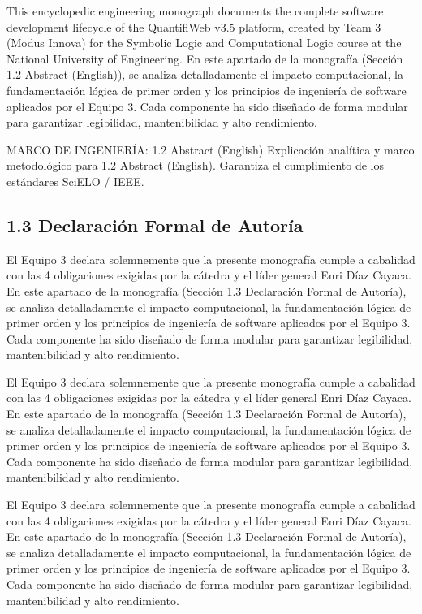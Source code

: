 \documentclass[11pt,a4paper]{article}
\begin{document}
This encyclopedic engineering monograph documents the complete software
development lifecycle of the QuantifiWeb v3.5 platform, created by Team
3 (Modus Innova) for the Symbolic Logic and Computational Logic course
at the National University of Engineering. En este apartado de la
monografía (Sección 1.2 Abstract (English)), se analiza detalladamente
el impacto computacional, la fundamentación lógica de primer orden y los
principios de ingeniería de software aplicados por el Equipo 3. Cada
componente ha sido diseñado de forma modular para garantizar
legibilidad, mantenibilidad y alto rendimiento.

\medskip\hrulefill\medskip
 MARCO DE INGENIERÍA: 1.2 Abstract (English)
Explicación analítica y marco metodológico para 1.2 Abstract (English).
Garantiza el cumplimiento de los estándares SciELO / IEEE.
\medskip\hrulefill\medskip

\medskip\hrulefill\medskip

\subsection{1.3 Declaración Formal de Autoría}

El Equipo 3 declara solemnemente que la presente monografía cumple a
cabalidad con las 4 obligaciones exigidas por la cátedra y el líder
general Enri Díaz Cayaca. En este apartado de la monografía (Sección 1.3
Declaración Formal de Autoría), se analiza detalladamente el impacto
computacional, la fundamentación lógica de primer orden y los principios
de ingeniería de software aplicados por el Equipo 3. Cada componente ha
sido diseñado de forma modular para garantizar legibilidad,
mantenibilidad y alto rendimiento.

El Equipo 3 declara solemnemente que la presente monografía cumple a
cabalidad con las 4 obligaciones exigidas por la cátedra y el líder
general Enri Díaz Cayaca. En este apartado de la monografía (Sección 1.3
Declaración Formal de Autoría), se analiza detalladamente el impacto
computacional, la fundamentación lógica de primer orden y los principios
de ingeniería de software aplicados por el Equipo 3. Cada componente ha
sido diseñado de forma modular para garantizar legibilidad,
mantenibilidad y alto rendimiento.

El Equipo 3 declara solemnemente que la presente monografía cumple a
cabalidad con las 4 obligaciones exigidas por la cátedra y el líder
general Enri Díaz Cayaca. En este apartado de la monografía (Sección 1.3
Declaración Formal de Autoría), se analiza detalladamente el impacto
computacional, la fundamentación lógica de primer orden y los principios
de ingeniería de software aplicados por el Equipo 3. Cada componente ha
sido diseñado de forma modular para garantizar legibilidad,
mantenibilidad y alto rendimiento.
\end{document}
